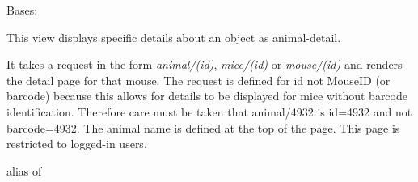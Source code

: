 \documentclass[letterpaper,10pt,english]{sphinxmanual}
\begin{document}

\begin{fulllineitems}
\label{api:mousedb.animal.views.AnimalDetail}
Bases: {\hyperref[api:mousedb.views.ProtectedDetailView]{}}

This view displays specific details about an {\hyperref[api:mousedb.animal.models.Animal]{}} object as animal-detail.

It takes a request in the form \emph{animal/(id)}, \emph{mice/(id)} or \emph{mouse/(id)} and renders the detail page for that mouse.  The request is defined for id not MouseID (or barcode) because this allows for details to be displayed for mice without barcode identification.
Therefore care must be taken that animal/4932 is id=4932 and not barcode=4932.  The animal name is defined at the top of the page.
This page is restricted to logged-in users.

\begin{fulllineitems}
\label{api:mousedb.animal.views.AnimalDetail.context_object_name}
\end{fulllineitems}


\begin{fulllineitems}
\label{api:mousedb.animal.views.AnimalDetail.model}
alias of 

\end{fulllineitems}


\begin{fulllineitems}
\label{api:mousedb.animal.views.AnimalDetail.template_name}
\end{fulllineitems}


\end{fulllineitems}

\end{document}
